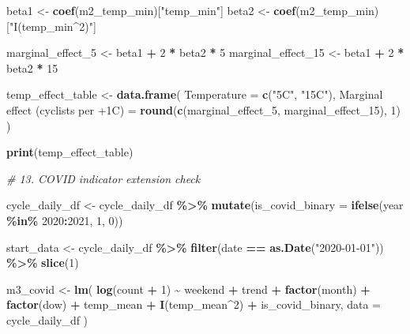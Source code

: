 \documentclass[
]{article}
\newenvironment{Shaded}{\begin{snugshade}}{\end{snugshade}}
\newcommand{\AttributeTok}[1]{\textcolor[rgb]{0.13,0.29,0.53}{#1}}
\newcommand{\CommentTok}[1]{\textcolor[rgb]{0.56,0.35,0.01}{\textit{#1}}}
\newcommand{\DecValTok}[1]{\textcolor[rgb]{0.00,0.00,0.81}{#1}}
\newcommand{\FunctionTok}[1]{\textcolor[rgb]{0.13,0.29,0.53}{\textbf{#1}}}
\newcommand{\NormalTok}[1]{#1}
\newcommand{\OtherTok}[1]{\textcolor[rgb]{0.56,0.35,0.01}{#1}}
\newcommand{\SpecialCharTok}[1]{\textcolor[rgb]{0.81,0.36,0.00}{\textbf{#1}}}
\newcommand{\StringTok}[1]{\textcolor[rgb]{0.31,0.60,0.02}{#1}}
\begin{document}
\begin{Shaded}
\begin{Highlighting}[]
\NormalTok{beta1 }\OtherTok{\textless{}{-}} \FunctionTok{coef}\NormalTok{(m2\_temp\_min)[}\StringTok{"temp\_min"}\NormalTok{]}
\NormalTok{beta2 }\OtherTok{\textless{}{-}} \FunctionTok{coef}\NormalTok{(m2\_temp\_min)[}\StringTok{"I(temp\_min\^{}2)"}\NormalTok{]}

\NormalTok{marginal\_effect\_5 }\OtherTok{\textless{}{-}}\NormalTok{ beta1 }\SpecialCharTok{+} \DecValTok{2} \SpecialCharTok{*}\NormalTok{ beta2 }\SpecialCharTok{*} \DecValTok{5}
\NormalTok{marginal\_effect\_15 }\OtherTok{\textless{}{-}}\NormalTok{ beta1 }\SpecialCharTok{+} \DecValTok{2} \SpecialCharTok{*}\NormalTok{ beta2 }\SpecialCharTok{*} \DecValTok{15}

\NormalTok{temp\_effect\_table }\OtherTok{\textless{}{-}} \FunctionTok{data.frame}\NormalTok{(}
  \AttributeTok{Temperature =} \FunctionTok{c}\NormalTok{(}\StringTok{"5C"}\NormalTok{, }\StringTok{"15C"}\NormalTok{),}
  \StringTok{\textasciigrave{}}\AttributeTok{Marginal effect (cyclists per +1C)}\StringTok{\textasciigrave{}} \OtherTok{=} \FunctionTok{round}\NormalTok{(}\FunctionTok{c}\NormalTok{(marginal\_effect\_5, marginal\_effect\_15), }\DecValTok{1}\NormalTok{)}
\NormalTok{)}

\FunctionTok{print}\NormalTok{(temp\_effect\_table)}

\CommentTok{\# 13. COVID indicator extension check}

\NormalTok{cycle\_daily\_df }\OtherTok{\textless{}{-}}\NormalTok{ cycle\_daily\_df }\SpecialCharTok{\%\textgreater{}\%}
  \FunctionTok{mutate}\NormalTok{(}\AttributeTok{is\_covid\_binary =} \FunctionTok{ifelse}\NormalTok{(year }\SpecialCharTok{\%in\%} \DecValTok{2020}\SpecialCharTok{:}\DecValTok{2021}\NormalTok{, }\DecValTok{1}\NormalTok{, }\DecValTok{0}\NormalTok{))}

\NormalTok{start\_data }\OtherTok{\textless{}{-}}\NormalTok{ cycle\_daily\_df }\SpecialCharTok{\%\textgreater{}\%}
  \FunctionTok{filter}\NormalTok{(date }\SpecialCharTok{==} \FunctionTok{as.Date}\NormalTok{(}\StringTok{"2020{-}01{-}01"}\NormalTok{)) }\SpecialCharTok{\%\textgreater{}\%}
  \FunctionTok{slice}\NormalTok{(}\DecValTok{1}\NormalTok{)}

\NormalTok{m3\_covid }\OtherTok{\textless{}{-}} \FunctionTok{lm}\NormalTok{(}
  \FunctionTok{log}\NormalTok{(count }\SpecialCharTok{+} \DecValTok{1}\NormalTok{) }\SpecialCharTok{\textasciitilde{}}\NormalTok{ weekend }\SpecialCharTok{+}\NormalTok{ trend }\SpecialCharTok{+} \FunctionTok{factor}\NormalTok{(month) }\SpecialCharTok{+} \FunctionTok{factor}\NormalTok{(dow) }\SpecialCharTok{+}
\NormalTok{    temp\_mean }\SpecialCharTok{+} \FunctionTok{I}\NormalTok{(temp\_mean}\SpecialCharTok{\^{}}\DecValTok{2}\NormalTok{) }\SpecialCharTok{+}\NormalTok{ is\_covid\_binary,}
  \AttributeTok{data =}\NormalTok{ cycle\_daily\_df}
\NormalTok{)}


\end{Highlighting}
\end{Shaded}
\end{document}
